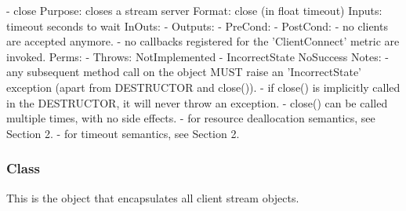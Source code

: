 \begin{myspec}
    - close
      Purpose:  closes a stream server
      Format:   close                (in float timeout)
      Inputs:   timeout               seconds to wait
      InOuts:   -
      Outputs:  -
      PreCond:  - 
      PostCond: - no clients are accepted anymore.
                - no callbacks registered for the
                  'ClientConnect' metric are invoked.
      Perms:    -
      Throws:   NotImplemented
-               IncorrectState
                NoSuccess
      Notes:    - any subsequent method call on the object
                  MUST raise an 'IncorrectState' exception
                  (apart from DESTRUCTOR and close()).
                - if close() is implicitly called in the
                  DESTRUCTOR, it will never throw an exception.
                - close() can be called multiple times, with no
                  side effects.
                - for resource deallocation semantics, see 
                  Section 2.
                - for timeout semantics, see Section 2.
 \end{myspec}
 
 
  \subsubsection*{Class }
 
    This is the object that encapsulates all client stream
    objects.
 

